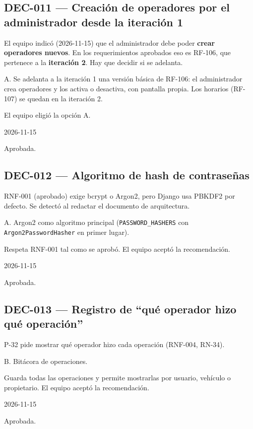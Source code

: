 \subsection{DEC-011 — Creación de operadores por el administrador desde la iteración 1}
\begin{description}[style=nextline]
  \item[Problema] El equipo indicó (2026-11-15) que el administrador debe poder \textbf{crear operadores nuevos}. En los requerimientos aprobados eso es RF-106, que pertenece a la \textbf{iteración 2}. Hay que decidir si se adelanta.
  \item[Decisión seleccionada] A. Se adelanta a la iteración 1 una versión básica de RF-106: el administrador crea operadores y los activa o desactiva, con pantalla propia. Los horarios (RF-107) se quedan en la iteración 2.
  \item[Justificación] El equipo eligió la opción A.
  \item[Fecha] 2026-11-15
  \item[Estado] Aprobada.
\end{description}
\subsection{DEC-012 — Algoritmo de hash de contraseñas}
\begin{description}[style=nextline]
  \item[Problema] RNF-001 (aprobado) exige bcrypt o Argon2, pero Django usa PBKDF2 por defecto. Se detectó al redactar el documento de arquitectura.
  \item[Decisión seleccionada] A. Argon2 como algoritmo principal (\texttt{PASSWORD\_HASHERS} con \texttt{Argon2PasswordHasher} en primer lugar).
  \item[Justificación] Respeta RNF-001 tal como se aprobó. El equipo aceptó la recomendación.
  \item[Fecha] 2026-11-15
  \item[Estado] Aprobada.
\end{description}
\subsection{DEC-013 — Registro de ``qué operador hizo qué operación''}
\begin{description}[style=nextline]
  \item[Problema] P-32 pide mostrar qué operador hizo cada operación (RNF-004, RN-34).
  \item[Decisión seleccionada] B. Bitácora de operaciones.
  \item[Justificación] Guarda todas las operaciones y permite mostrarlas por usuario, vehículo o propietario. El equipo aceptó la recomendación.
  \item[Fecha] 2026-11-15
  \item[Estado] Aprobada.
\end{description}
